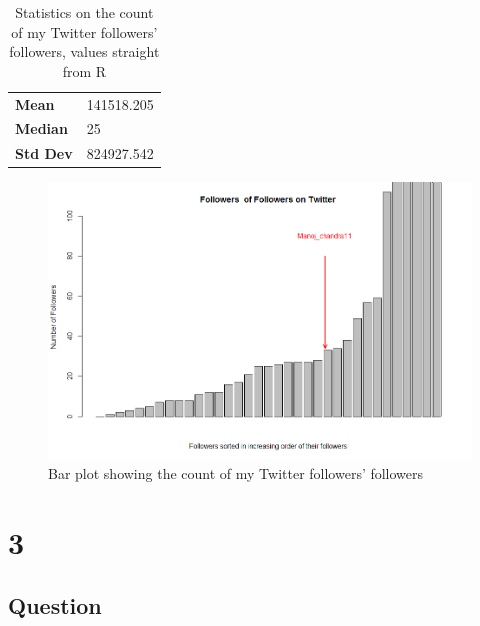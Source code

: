 \documentclass[letterpaper,11pt]{article}
\begin{document}
\begin{table}
\begin{tabular}{ l l }
\hline
\textbf{Mean} & 141518.205 \\
\textbf{Median} &  25 \\
\textbf{Std Dev} & 824927.542 \\
\hline
\end{tabular}
\caption{Statistics on the count of my Twitter followers' followers, values straight from R}
\label{tab:q2statistics}
\end{table}

\clearpage
\begin{figure}[h]
\includegraphics[scale=0.35]{qn2/Rimage.png}
\caption{Bar plot showing the count of my Twitter followers' followers}
\label{fig:q2barplot}
\end{figure}


\newpage


\newpage





\newpage
\section*{3}

\subsection*{Question}
\end{document}
